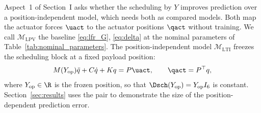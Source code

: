 Aspect~1 of Section~I asks whether the scheduling by $Y$ improves prediction
over a position-independent model, which needs both as compared models.
Both map the actuator forces $\uact$ to the actuator positions $\qact$
without training.
We call $\mathcal M_{\mathrm{LPV}}$ the baseline \eqref{eq:lfr_G},
\eqref{eq:delta} at the nominal parameters of
Table~\ref{tab:nominal_parameters}.
The position-independent model $\mathcal M_{\mathrm{LTI}}$ freezes the
scheduling block at a fixed payload position:
\begin{equation}
  M(Y_{\mathrm{op}})\ddot q+C\dot q+Kq=P\uact,\qquad \qact=P^\top q,
  \label{eq:lti}
\end{equation}
where $Y_{\mathrm{op}}\in\R$ is the frozen position, so that
$\Dsch(Y_{\mathrm{op}})=Y_{\mathrm{op}}I_6$ is constant.
Section~\ref{sec:results} uses the pair to demonstrate the size of the
position-dependent prediction error.
